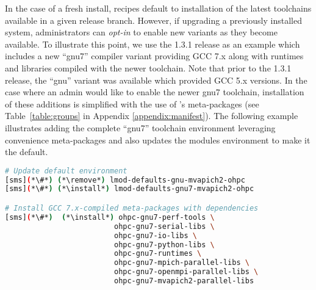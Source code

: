 In the case of a fresh install, \OHPC{} recipes default to installation of the
latest toolchains available in a given release branch. However, if upgrading a
previously installed system, administrators can {\em opt-in} to enable new
variants as they become available. To illustrate this point, we use the \OHPC{}
1.3.1 release as an example which includes a new {``gnu7''} compiler variant
providing GCC 7.x along with runtimes and libraries compiled
with the newer toolchain. Note that prior to the 1.3.1 release, the {``gnu''} variant was
available which provided GCC 5.x versions.
In the case where an admin would like to enable the newer {gnu7} toolchain,
installation of these additions is simplified
with the use of \OHPC{}'s meta-packages (see Table~\ref{table:groups} in Appendix 
\ref{appendix:manifest}).
The following example illustrates adding the complete ``gnu7'' toolchain
environment leveraging convenience meta-packages and also updates the modules environment to make it the default.

\begin{lstlisting}[language=bash,keywords={}]
# Update default environment
[sms](*\#*) (*\remove*) lmod-defaults-gnu-mvapich2-ohpc
[sms](*\#*) (*\install*) lmod-defaults-gnu7-mvapich2-ohpc

# Install GCC 7.x-compiled meta-packages with dependencies
[sms](*\#*)  (*\install*) ohpc-gnu7-perf-tools \
                         ohpc-gnu7-serial-libs \
                         ohpc-gnu7-io-libs \
                         ohpc-gnu7-python-libs \
                         ohpc-gnu7-runtimes \
                         ohpc-gnu7-mpich-parallel-libs \
                         ohpc-gnu7-openmpi-parallel-libs \
                         ohpc-gnu7-mvapich2-parallel-libs
\end{lstlisting}

